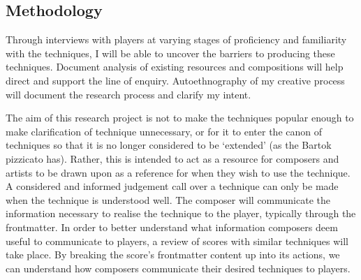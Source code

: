 
\subsection{Methodology}
Through interviews with players at varying stages of proficiency and familiarity with the techniques, I will be able to uncover the barriers to producing these techniques. 
Document analysis of existing resources and compositions will help direct and support the line of enquiry. 
Autoethnography of my creative process will document the research process and clarify my intent.  

The aim of this research project is not to make the techniques popular enough to make clarification of technique unnecessary, or for it to enter the canon of techniques so that it is no longer considered to be `extended' (as the Bartok pizzicato has).
Rather, this is intended to act as a resource for composers and artists to be drawn upon as a reference for when they wish to use the technique.
A considered and informed judgement call over a technique can only be made when the technique is understood well.
The composer will communicate the information necessary to realise the technique to the player, typically through the frontmatter. 
In order to better understand what information composers deem useful to communicate to players, a review of scores with similar techniques will take place.
By breaking the score's frontmatter content up into its actions, we can understand how composers communicate their desired techniques to players.

